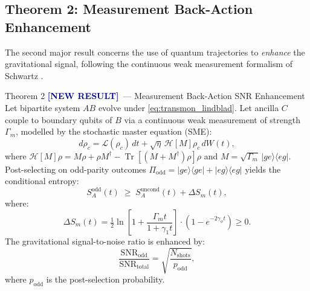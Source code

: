 \documentclass[12pt,a4paper]{article}
\newcommand{\NEW}{\textcolor{darkblue}{\textbf{[NEW RESULT]}}}
\theoremstyle{monette}
\theoremstyle{definition}
\newcommand{\SA}{S_A}
\newcommand{\gamone}{\gamma_1}
\newcommand{\gamphi}{\gamma_\phi}
\newcommand{\Liouv}{\mathcal{L}}
\renewcommand{\Tr}{\operatorname{Tr}}
\newcommand{\half}{\tfrac{1}{2}}
\begin{document}
\subsection{Theorem 2: Measurement Back-Action Enhancement}
\label{sec:theorem2}

The second major result concerns the use of quantum trajectories to
\emph{enhance} the gravitational signal, following the continuous
weak measurement formalism of Schwartz \cite{Schwartz2016}.

\begin{thmbox}{Theorem 2 \NEW\ --- Measurement Back-Action SNR Enhancement}
Let bipartite system $AB$ evolve under \cref{eq:transmon_lindblad}.
Let ancilla $C$ couple to boundary qubits of $B$ via a continuous
weak measurement of strength $\Gamma_m$, modelled by the stochastic
master equation (SME):
\begin{equation}
  d\rho_c = \Liouv(\rho_c)\,dt
    + \sqrt{\eta}\,\mathcal{H}[M]\rho_c\,dW(t),
  \label{eq:SME}
\end{equation}
where $\mathcal{H}[M]\rho = M\rho + \rho M^\dagger - \Tr[(M+M^\dagger)\rho]\rho$
and $M = \sqrt{\Gamma_m}\,|ge\rangle\!\langle eg|$.
Post-selecting on odd-parity outcomes
$\Pi_{\mathrm{odd}} = |ge\rangle\!\langle ge| + |eg\rangle\!\langle eg|$
yields the conditional entropy:
\begin{equation}
  \SA^{\mathrm{odd}}(t) \;\geq\; \SA^{\mathrm{uncond}}(t) + \Delta S_m(t),
  \label{eq:thm2_bound}
\end{equation}
where:
\begin{equation}
  \Delta S_m(t) = \half\ln\!\left[1 + \frac{\Gamma_m t}{1 + \gamone t}\right]
    \cdot\left(1 - e^{-2\gamphi t}\right) \geq 0.
  \label{eq:DeltaS}
\end{equation}
The gravitational signal-to-noise ratio is enhanced by:
\begin{equation}
  \frac{\mathrm{SNR}_{\mathrm{odd}}}{\mathrm{SNR}_{\mathrm{total}}}
    = \sqrt{\frac{N_{\mathrm{shots}}}{p_{\mathrm{odd}}}},
  \label{eq:SNR_boost}
\end{equation}
where $p_{\mathrm{odd}}$ is the post-selection probability.
\end{thmbox}
\end{document}
